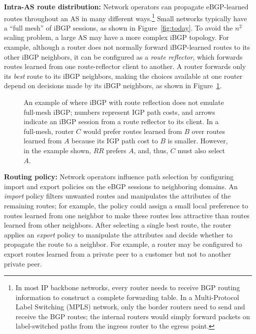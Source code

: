 \textbf{Intra-AS route distribution:} Network operators can propagate
eBGP-learned routes throughout an AS in many different ways.\footnote{In
most IP backbone networks, every router needs to receive BGP routing
information to construct a complete forwarding table.  In a
Multi-Protocol Label Switching (MPLS) network, only the border routers
need to send and receive the BGP routes; the internal routers would
simply forward packets on label-switched paths from the ingress router
to the egress point.}  Small networks typically have a ``full mesh'' of
iBGP sessions, as shown in Figure~\ref{fig:today}.  To avoid the $n^2$
scaling problem, a large AS may have a more complex iBGP
topology.
For example, although a router does not normally forward
iBGP-learned routes to its other iBGP neighbors, it can be configured
as a {\em route reflector\/}, which forwards routes learned from one
route-reflector client to another.  A router forwards only its {\em
best\/} route to its iBGP neighbors, making the choices available at one
router depend on decisions made by its iBGP neighbors, as shown in
Figure~\ref{fig:rr}.
\begin{figure}
\centering{}
\caption[An example route reflector topology that does not emulate
full-mesh iBGP.]{An example of where iBGP with route reflection does not
emulate 
full-mesh iBGP; numbers represent IGP path costs, and arrows
indicate an iBGP session from a route reflector to its client.  In a
full-mesh, router $C$ would prefer routes learned from $B$ over routes
learned from $A$ because its IGP path cost to $B$ is smaller.  However,
in the example shown, $RR$ prefers $A$, and, thus, $C$ must also select $A$.}
\label{fig:rr}
\end{figure}

\textbf{Routing policy:}
Network operators influence path selection by configuring import and
export policies on the eBGP sessions to neighboring domains.  An {\em
  import\/} policy 
filters unwanted routes and manipulates the attributes of the
remaining routes; for example, the policy could assign a small local
preference to routes learned from one neighbor to make these routes
less attractive than routes learned from other neighbors.  After
selecting a single best route, the router applies an {\em export\/}
policy to manipulate the attributes and decide whether to propagate
the route to a neighbor.  For example, a router may be configured to
export routes learned from a private peer to a customer but not to
another private peer.

